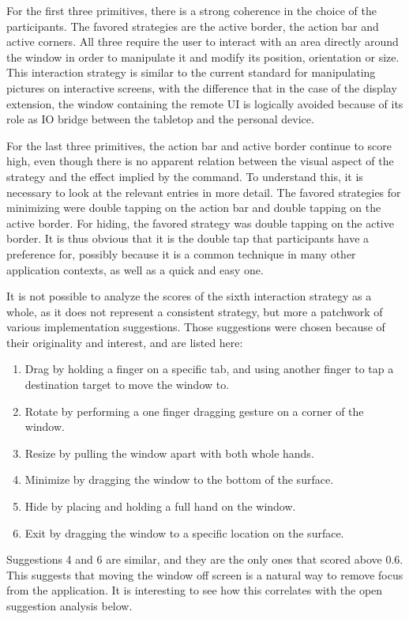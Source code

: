 For the first three primitives, there is a strong coherence in the choice of the participants.
The favored strategies are the active border, the action bar and active corners.
All three require the user to interact with an area directly around the window in order to manipulate it and modify its position, orientation or size.
This interaction strategy is similar to the current standard for manipulating pictures on interactive screens, with the difference that in the case of the display extension, the window containing the remote UI is logically avoided because of its role as IO bridge between the tabletop and the personal device.

For the last three primitives, the action bar and active border continue to score high, even though there is no apparent relation between the visual aspect of the strategy and the effect implied by the command.
To understand this, it is necessary to look at the relevant entries in more detail.
The favored strategies for minimizing were double tapping on the action bar and double tapping on the active border.
For hiding, the favored strategy was double tapping on the active border.
It is thus obvious that it is the double tap that participants have a preference for, possibly because it is a common technique in many other application contexts, as well as a quick and easy one.

It is not possible to analyze the scores of the sixth interaction strategy as a whole, as it does not represent a consistent strategy, but more a patchwork of various implementation suggestions.
Those suggestions were chosen because of their originality and interest, and are listed here:
\begin{enumerate}
\item Drag by holding a finger on a specific tab, and using another finger to tap a destination target to move the window to.
\item Rotate by performing a one finger dragging gesture on a corner of the window.
\item Resize by pulling the window apart with both whole hands.
\item Minimize by dragging the window to the bottom of the surface.
\item Hide by placing and holding a full hand on the window.
\item Exit by dragging the window to a specific location on the surface.
\end{enumerate}
Suggestions 4 and 6 are similar, and they are the only ones that scored above 0.6.
This suggests that moving the window off screen is a natural way to remove focus from the application.
It is interesting to see how this correlates with the open suggestion analysis below.

